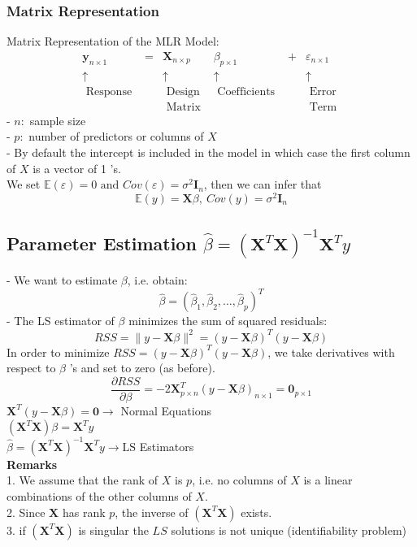 \documentclass[11pt,a4paper]{article}
\begin{document}
\subsubsection{Matrix Representation}
Matrix Representation of the MLR Model:
$$\begin{array}{cccccc}\mathbf{y}_{n \times 1} & = & \mathbf{X}_{n \times p} & \beta_{p \times 1} & + & \varepsilon_{n \times 1} \\ \uparrow & &\uparrow & \uparrow & &\uparrow \\ \text { Response }& & \text { Design } & \text { Coefficients } & &\text { Error } \\ & & \text { Matrix } & & &\text { Term }\end{array}$$
- $n:$ sample size\\
- $p:$ number of predictors or columns of $X$\\
- By default the intercept is included in the model in which case the first column of $X$ is a vector of 1 's.\\
We set $\mathbb{E}(\varepsilon)=0\text{ and }Cov(\varepsilon)=\sigma^2 \mathbf{I}_n$, then we can infer that
$$\mathbb{E}(y)= \mathbf{X}\beta,\ Cov(y)=\sigma^2 \mathbf{I}_n$$

\subsection{Parameter Estimation $\hat{\beta}=\left(\mathbf{X}^{T} \mathbf{X}\right)^{-1} \mathbf{X}^{T} y$}
- We want to estimate $\beta$, i.e. obtain:
$$
\hat{\beta}=\left(\hat{\beta}_{1}, \hat{\beta}_{2}, \ldots, \hat{\beta}_{p}\right)^{T}
$$
- The LS estimator of $\beta$ minimizes the sum of squared residuals:
$$
R S S=\|y-\mathbf{X} \beta\|^{2}=(y-\mathbf{X} \beta)^{T}(y-\mathbf{X} \beta)
$$
In order to minimize $R S S=(y-\mathbf{X} \beta)^{T}(y-\mathbf{X} \beta)$, we take derivatives with respect to $\beta$ 's and set to zero (as before).\\
$$\frac{\partial R S S}{\partial \beta}=-2 \mathbf{X}_{p \times n}^{T}(y-\mathbf{X} \beta)_{n \times 1}=\mathbf{0}_{p \times 1}$$
$\mathbf{X}^{T}(y-\mathbf{X} \beta)=\mathbf{0} \longrightarrow$ Normal Equations\\
$\left(\mathbf{X}^{T} \mathbf{X}\right) \beta=\mathbf{X}^{T} y$\\
$\hat{\beta}=\left(\mathbf{X}^{T} \mathbf{X}\right)^{-1} \mathbf{X}^{T} y \rightarrow \mathrm{LS}$ Estimators\\
\textbf{Remarks}\\
1. We assume that the rank of $X$ is $p$, i.e. no columns of $X$ is a linear combinations of the other columns of $X$.\\
2. Since $\mathbf{X}$ has rank $p$, the inverse of $\left(\mathbf{X}^{T} \mathbf{X}\right)$ exists.\\
3. if $\left(\mathbf{X}^{T} \mathbf{X}\right)$ is singular the $LS$ solutions is not unique (identiﬁability problem)
\end{document}
